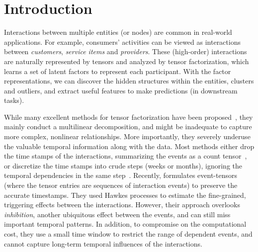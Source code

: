 
\section{Introduction}
Interactions between multiple entities (or nodes) are common in real-world applications. For example, consumers' activities can be viewed as interactions between \textit{customers}, \textit{service items} and \textit{providers}. These (high-order) interactions are naturally represented by tensors and analyzed by tensor factorization, which learns a set of latent factors to represent each participant. With the factor representations, we can discover the hidden structures within the entities, \eg clusters and outliers, and extract useful features to make predictions (in downstream tasks). 

While many excellent methods for tensor factorization have been proposed~\citep{Tucker66,Harshman70parafac,Chu09ptucker,kang2012gigatensor,choi2014dfacto}, they mainly conduct a multilinear decomposition, and might  be inadequate to capture more complex, nonlinear relationships. More importantly, they severely underuse the valuable temporal information along with the data. Most methods either drop the time stamps of the interactions,  summarizing the events as a count tensor~\citep{chi2012tensors, HaPlKo15, Hu2015CountTensor}, or discretize the time stamps into crude steps (\eg weeks or months), ignoring the temporal dependencies  in the same step~\citep{xiong2010temporal, schein2015bayesian, Schein:2016:BPT:3045390.3045686}.  Recently, \citet{zhe2018stochastic} formulates event-tensors (where the tensor entries are sequences of interaction events) to preserve the accurate timestamps. They used Hawkes processes to estimate the fine-grained, triggering effects between the interactions. However, their approach overlooks \textit{inhibition}, another ubiquitous effect between the events, and can still miss important temporal patterns. In addition, to compromise on the computational cost, they use a small time window to restrict the range of dependent events, and cannot capture long-term temporal influences of the interactions. 


